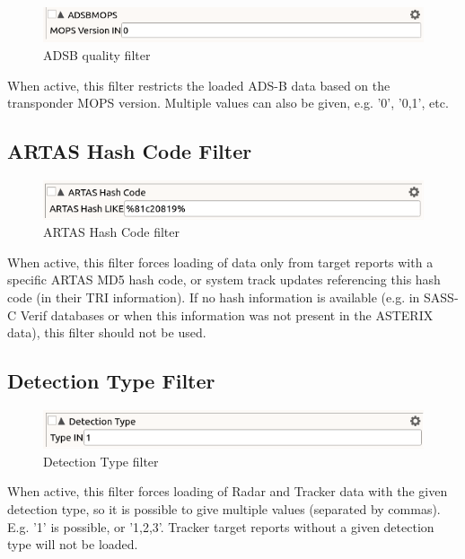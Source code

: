 \begin{figure}[H]
  \center
    \includegraphics[width=12cm,frame]{figures/filter_adsb_mops.png}
  \caption{ADSB quality filter}
\end{figure}

When active, this filter restricts the loaded ADS-B data based on the transponder MOPS version. Multiple values can also be given, e.g. '0', '0,1', etc. 

\subsection{ARTAS Hash Code Filter}

\begin{figure}[H]
  \center
    \includegraphics[width=12cm,frame]{figures/filter_hashcode.png}
  \caption{ARTAS Hash Code filter}
\end{figure}

When active, this filter forces loading of data only from target reports with a specific ARTAS MD5 hash code, or system track updates referencing this hash code (in their TRI information). If no hash information is available (e.g. in SASS-C Verif databases or when this information was not present in the ASTERIX data), this filter should not be used.

\subsection{Detection Type Filter}

\begin{figure}[H]
  \center
    \includegraphics[width=12cm,frame]{figures/filter_detection_type.png}
  \caption{Detection Type filter}
\end{figure}

When active, this filter forces loading of Radar and Tracker data with the given detection type, so it is possible to give multiple values (separated by commas). E.g. '1' is possible, or '1,2,3'. Tracker target reports without a given detection type will not be loaded. \\

